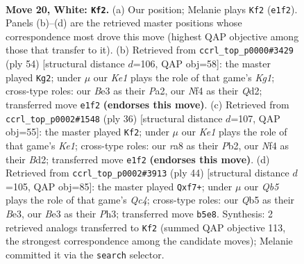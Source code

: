 \documentclass[11pt]{article}
\begin{document}
\begin{figure}[p]
\label{fig:thought-m36}
\end{figure}

\clearpage

\begin{figure}[p]\centering
\begin{subfigure}{0.46\textwidth}\centering
\resizebox{\linewidth}{!}{%
\newchessgame
\chessboard[
  setfen={rnbq1kr1/1p2n3/4p3/1QP1Pp2/p1B2N2/P3B3/2P3Pp/R3K2R w KQ - 0 20},
  showmover=false,
  pgfstyle=straightmove, color=movearrow, markmove={e1-f2}
]}
\caption{}
\end{subfigure}\hfill
\begin{subfigure}{0.46\textwidth}\centering
\resizebox{\linewidth}{!}{%
\newchessgame
\chessboard[
  setfen={2r3k1/q5b1/p4nbp/3ppp2/1P5B/1B2PPN1/PP1Q4/5RK1 w - - 0 28},
  showmover=false,
  pgfstyle=straightmove, color=movearrow, markmove={g1-g2}
]}
\caption{}
\end{subfigure}
\\[4pt]
\begin{subfigure}{0.46\textwidth}\centering
\resizebox{\linewidth}{!}{%
\newchessgame
\chessboard[
  setfen={3rr1k1/pp3ppp/1n1q4/3p2Pb/3Q4/2N1PPR1/PP1B3P/R3K3 w Q - 1 19},
  showmover=false,
  pgfstyle=straightmove, color=movearrow, markmove={e1-f2}
]}
\caption{}
\end{subfigure}\hfill
\begin{subfigure}{0.46\textwidth}\centering
\resizebox{\linewidth}{!}{%
\newchessgame
\chessboard[
  setfen={2b1rbk1/5pp1/pq3n1p/2p1N3/P1Q1PP2/4B2P/1P4P1/3R2K1 w - - 0 23},
  showmover=false,
  pgfstyle=straightmove, color=movearrow, markmove={c4-f7}
]}
\caption{}
\end{subfigure}
\caption{\textbf{Move 20, White: \texttt{Kf2}.} (a) Our position; Melanie plays \texttt{Kf2} (\texttt{e1f2}). Panels (b)--(d) are the retrieved master positions whose correspondence most drove this move (highest QAP objective among those that transfer to it). (b) Retrieved from \texttt{ccrl\_top\_p0000\#3429} (ply 54) [structural distance $d$=106, QAP obj=58]: the master played \texttt{Kg2}; under $\mu$ our \emph{Ke1} plays the role of that game's \emph{Kg1}; cross-type roles: our \emph{B}e3 as their \emph{P}a2, our \emph{N}f4 as their \emph{Q}d2; transferred move \texttt{e1f2} \textbf{(endorses this move)}. (c) Retrieved from \texttt{ccrl\_top\_p0002\#1548} (ply 36) [structural distance $d$=107, QAP obj=55]: the master played \texttt{Kf2}; under $\mu$ our \emph{Ke1} plays the role of that game's \emph{Ke1}; cross-type roles: our \emph{r}a8 as their \emph{P}b2, our \emph{N}f4 as their \emph{B}d2; transferred move \texttt{e1f2} \textbf{(endorses this move)}. (d) Retrieved from \texttt{ccrl\_top\_p0002\#3913} (ply 44) [structural distance $d$=105, QAP obj=85]: the master played \texttt{Qxf7+}; under $\mu$ our \emph{Qb5} plays the role of that game's \emph{Qc4}; cross-type roles: our \emph{Q}b5 as their \emph{B}e3, our \emph{B}e3 as their \emph{P}h3; transferred move \texttt{b5e8}. Synthesis: 2 retrieved analogs transferred to \texttt{Kf2} (summed QAP objective 113, the strongest correspondence among the candidate moves); Melanie committed it via the \texttt{search} selector.}
\label{fig:thought-m38}
\end{figure}
\end{document}
